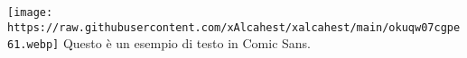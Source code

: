\documentclass{article}
\begin{document}
\texttt{[image: https://raw.githubusercontent.com/xAlcahest/xalcahest/main/okuqw07cgpe61.webp]}
\newline
Questo è un esempio di testo in Comic Sans.
\end{document}
